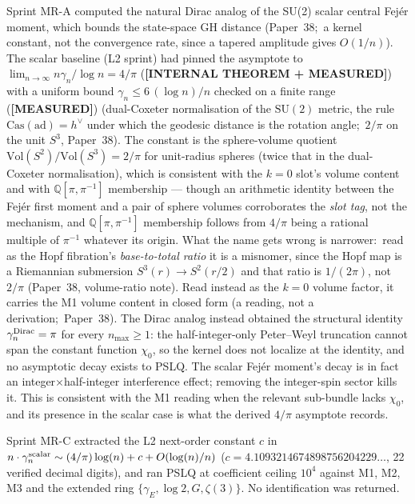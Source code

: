 \documentclass[aps,pra,twocolumn,superscriptaddress,longbibliography]{revtex4-2}
\begin{document}
Sprint MR-A computed the natural Dirac analog of the SU(2) scalar
central Fej{\'e}r moment, which bounds the state-space GH distance
(Paper~38;\ a kernel constant, not the convergence rate, since a tapered
amplitude gives $O(1/n)$). The scalar baseline (L2 sprint) had pinned the asymptote to
$\lim_{n \to \infty} n \gamma_n / \log n = 4/\pi$ (\textbf{[INTERNAL THEOREM + MEASURED]}) with a uniform
bound $\gamma_n \le 6\,(\log n)/n$ checked on a finite range (\textbf{[MEASURED]}) (dual-Coxeter
normalisation of the $\mathrm{SU}(2)$ metric, the rule
$\mathrm{Cas}(\mathrm{ad}) = h^\vee$ under which the geodesic distance is the
rotation angle;\ $2/\pi$ on the unit $S^3$, Paper~38).  The
constant is the sphere-volume quotient
$\mathrm{Vol}(S^2)/\mathrm{Vol}(S^3) = 2/\pi$ for unit-radius spheres
(twice that in the dual-Coxeter normalisation), which is consistent with
the $k = 0$ slot's volume content and with $\mathbb{Q}[\pi, \pi^{-1}]$
membership --- though an arithmetic identity between the Fej\'er first moment
and a pair of sphere volumes corroborates the \emph{slot tag}, not the
mechanism, and $\mathbb{Q}[\pi,\pi^{-1}]$ membership follows from $4/\pi$
being a rational multiple of $\pi^{-1}$ whatever its origin.  What the name
gets wrong is narrower:\ read as the Hopf fibration's \emph{base-to-total
ratio} it is a misnomer, since the Hopf map is a Riemannian submersion
$S^3(r) \to S^2(r/2)$ and that ratio is $1/(2\pi)$, not $2/\pi$ (Paper~38,
volume-ratio note).  Read instead as the $k = 0$ volume factor, it
carries the M1 volume content in closed form (a reading, not a
derivation;\ Paper~38). The Dirac analog instead obtained the
structural identity $\gamma_n^{\rm Dirac} = \pi$ for every $n_{\max} \ge 1$:
the half-integer-only Peter--Weyl truncation cannot span the constant
function $\chi_0$, so the kernel does not localize at the identity, and
no asymptotic decay exists to PSLQ. The scalar Fej\'er moment's decay is in
fact an integer$\times$half-integer interference effect; removing the
integer-spin sector kills it. This is consistent with the M1 reading
when the relevant sub-bundle lacks $\chi_0$, and its presence in the
scalar case is what the derived $4/\pi$ asymptote records.

Sprint MR-C extracted the L2 next-order constant $c$ in
$n \cdot \gamma_n^{\rm scalar} \sim (4/\pi)\log(n) + c + O(\log(n)/n)$
($c = 4.1093214674898756204229\ldots$, 22 verified decimal digits), and ran PSLQ
at coefficient ceiling $10^4$ against M1, M2, M3 and the extended
ring $\{\gamma_E, \log 2, G, \zeta(3)\}$. No identification was
returned.
\end{document}
